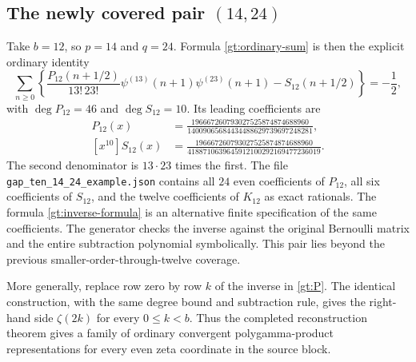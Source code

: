 \subsection[The newly covered pair (14,24)]{The newly covered pair $(14,24)$}

Take $b=12$, so $p=14$ and $q=24$. Formula \eqref{gt:ordinary-sum}
is then the explicit ordinary identity
\[
 \sum_{n\ge0}\left\{
 \frac{P_{12}(n+1/2)}{13!\,23!}
 \psi^{(13)}(n+1)\psi^{(23)}(n+1)-S_{12}(n+1/2)
                         \right\}=-\frac12,
\]
with $\deg P_{12}=46$ and $\deg S_{12}=10$. Its leading coefficients are
\begin{align*}
 [x^{46}]P_{12}(x)
 &=\frac{196667260793027525874874688960}
          {14009065684434488629739697248281},\\
 [x^{10}]S_{12}(x)
 &=\frac{196667260793027525874874688960}
          {4188710639645912100292169477236019}.
\end{align*}
The second denominator is $13\cdot23$ times the first.
The file \texttt{gap\_ten\_14\_24\_example.json} contains all $24$
even coefficients of $P_{12}$, all six coefficients of $S_{12}$,
and the twelve coefficients of $K_{12}$ as exact rationals.
The formula \eqref{gt:inverse-formula} is an alternative finite
specification of the same coefficients. The generator checks the
inverse against the original Bernoulli matrix and the entire
subtraction polynomial symbolically. This pair lies beyond the
previous smaller-order-through-twelve coverage.

More generally, replace row zero by row $k$ of the inverse in
\eqref{gt:P}. The identical construction, with the same degree
bound and subtraction rule, gives the right-hand side
$\zeta(2k)$ for every $0\le k<b$. Thus the completed reconstruction
theorem gives a family of ordinary convergent polygamma-product
representations for every even zeta coordinate in the source block.

